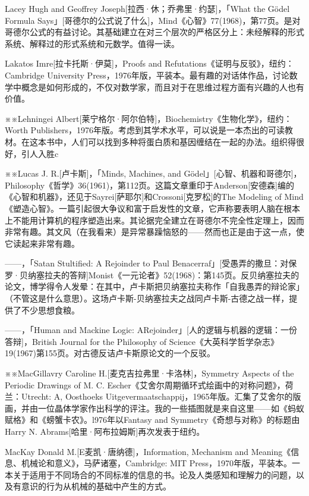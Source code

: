 \documentclass[
  12pt,
  twoside,
  openright,
  oldfontcommands,
]{memoir}
\begin{document}
Lacey Hugh and Geoffrey Joseph{[}拉西·休；乔弗里·约瑟{]}，「What the
Gödel Formula
Says」{[}哥德尔的公式说了什么{]}，Mind《心智》77(1968)，第77页。是对哥德尔公式的有益讨论。其基础建立在对三个层次的严格区分上：未经解释的形式系统、解释过的形式系统和元数学。值得一读。

Lakatos Imre{[}拉卡托斯·伊莫{]}，Proofs and
Refutations《证明与反驳》，纽约：Cambridge University
Press，1976年版，平装本。最有趣的对话体作品，讨论数学中概念是如何形成的，不仅对数学家，而且对于在思维过程方面有兴趣的人也有价值。

※※Lehningei
Albert{[}莱宁格尔·阿尔伯特{]}，Biochemistry《生物化学》，纽约：Worth
Publishers，1976年版。考虑到其学术水平，可以说是一本杰出的可读教材。在这本书中，人们可以找到多种将蛋白质和基因缠结在一起的办法。组织得很好，引人入胜c

※※Lucas J. R.{[}卢卡斯{]}，「Minds, Machines, and
Gödel」{[}心智、机器和哥德尔{]}，Philosophy《哲学》36(1961)，第112页。这篇文章重印于Anderson{[}安德森{]}编的《心智和机器》，还见于Sayrei{[}萨耶尔{]}和Crossoni{[}克罗松{]}的The
Modeling of
Mind《塑造心智》。一篇引起很大争议和富于启发性的文章，它声称要表明人脑在根本上不能用计算机的程序塑造出来。其论据完全建立在哥德尔不完全性定理上，因而非常有趣。其文风（在我看来）是异常暴躁恼怒的------然而也正是由于这一点，使它读起来非常有趣。

------，「Satan Stultified: A Rejoinder to Paul
Benacerraf」{[}受愚弄的撒旦：对保罗·贝纳塞拉夫的答辩{]}Monist《一元论者》52(1968)：第145页。反贝纳塞拉夫的论文，博学得令人发晕：在其中，卢卡斯把贝纳塞拉夫称作「自我愚弄的辩论家」（不管这是什么意思）。这场卢卡斯-贝纳塞拉夫之战同卢卡斯-古德之战一样，提供了不少思想食粮。

------，「Human and Mackine Logic:
ARejoinder」{[}人的逻辑与机器的逻辑：一份答辩{]}，British Journal for
the Philosophy of
Science《大英科学哲学杂志》19(1967)第155页。对古德反诘卢卡斯原论文的一个反驳。

※※MacGillavry Caroline H.{[}麦克吉拉弗里·卡洛林{]}，Symmetry Aspects of
the Periodic Drawings of M. C.
Escher《艾舍尔周期循环式绘画中的对称问题》，荷兰：Utrecht: A,
Oosthoek\textquotesingle s
Uitgevermaatschappij，1965年版。汇集了艾舍尔的版画，并由一位晶体学家作出科学的评注。我的一些插图就是来自这里------如《蚂蚁赋格》和《螃蟹卡农》。l976年以Fantasy
and Symmetry《奇想与对称》的标题由Harry N.
Abrams{[}哈里·阿布拉姆斯{]}再次发表于纽约。

MacKay Donald M.{[}E麦凯·唐纳德{]}，Information, Mechanism and
Meaning《信息、机械论和意义》，马萨诸塞，Cambridge: MIT
Press，1970年版，平装本。一本关于适用于不同场合的不同标准的信息的书。论及人类感知和理解力的问题，以及有意识的行为从机械的基础中产生的方式。
\end{document}
